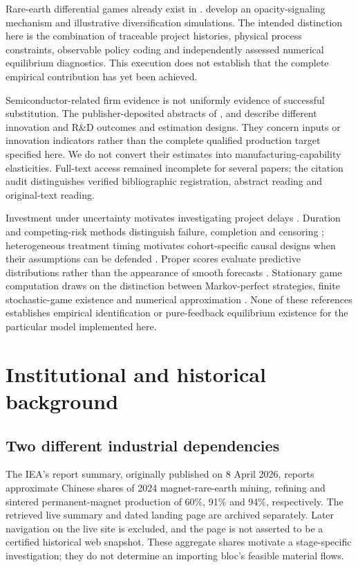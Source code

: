\documentclass[11pt]{article}
\begin{document}
Rare-earth differential games already exist in \citet{R04}. \citet{R03} develop an opacity-signaling mechanism and illustrative diversification simulations. The intended distinction here is the combination of traceable project histories, physical process constraints, observable policy coding and independently assessed numerical equilibrium diagnostics. This execution does not establish that the complete empirical contribution has yet been achieved.

Semiconductor-related firm evidence is not uniformly evidence of successful substitution. The publisher-deposited abstracts of \citet{R05}, \citet{R06} and \citet{R07} describe different innovation and R\&D outcomes and estimation designs. They concern inputs or innovation indicators rather than the complete qualified production target specified here. We do not convert their estimates into manufacturing-capability elasticities. Full-text access remained incomplete for several papers; the citation audit distinguishes verified bibliographic registration, abstract reading and original-text reading.

Investment under uncertainty motivates investigating project delays \citep{R08,R09,R10,R11}. Duration and competing-risk methods distinguish failure, completion and censoring \citep{R12,R13}; heterogeneous treatment timing motivates cohort-specific causal designs when their assumptions can be defended \citep{R14,R15}. Proper scores evaluate predictive distributions rather than the appearance of smooth forecasts \citep{R17,R18}. Stationary game computation draws on the distinction between Markov-perfect strategies, finite stochastic-game existence and numerical approximation \citep{R19,R20,R21,R22}. None of these references establishes empirical identification or pure-feedback equilibrium existence for the particular model implemented here.

\section{Institutional and historical background}
\subsection{Two different industrial dependencies}
The IEA's report summary, originally published on 8 April 2026, reports approximate Chinese shares of 2024 magnet-rare-earth mining, refining and sintered permanent-magnet production of 60\%, 91\% and 94\%, respectively. The retrieved live summary and dated landing page are archived separately. Later navigation on the live site is excluded, and the page is not asserted to be a certified historical web snapshot. These aggregate shares motivate a stage-specific investigation; they do not determine an importing bloc's feasible material flows.
\end{document}
